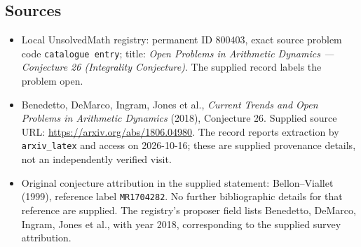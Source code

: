 \documentclass[11pt]{article}
\begin{document}
\subsection{Sources}
\begin{itemize}
\item Local UnsolvedMath registry: permanent ID \(800403\), exact source problem code \texttt{catalogue entry}; title: \emph{Open Problems in Arithmetic Dynamics --- Conjecture 26 (Integrality Conjecture)}. The supplied record labels the problem open.
\item Benedetto, DeMarco, Ingram, Jones et al., \emph{Current Trends and Open Problems in Arithmetic Dynamics} (2018), Conjecture 26. Supplied source URL: \url{https://arxiv.org/abs/1806.04980}. The record reports extraction by \texttt{arxiv\_latex} and access on 2026-10-16; these are supplied provenance details, not an independently verified visit.
\item Original conjecture attribution in the supplied statement: Bellon--Viallet (1999), reference label \texttt{MR1704282}. No further bibliographic details for that reference are supplied. The registry's proposer field lists Benedetto, DeMarco, Ingram, Jones et al., with year 2018, corresponding to the supplied survey attribution.
\end{itemize}
\end{document}
